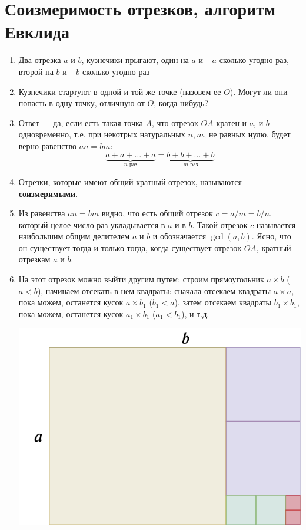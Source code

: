 \section{Соизмеримость отрезков, алгоритм Евклида}



\begin{enumerate}
\item Два отрезка $a$ и $b$, кузнечики прыгают, один на $a$ и $-a$ сколько угодно раз, второй на $b$ и $-b$ сколько угодно раз
\item Кузнечики стартуют в одной и той же точке (назовем ее $O$). Могут ли они попасть в одну точку, отличную от $O$, когда-нибудь?
\item Ответ --- да, если есть такая точка $A$, что отрезок $OA$ кратен и $a$, и $b$ одновременно, т.е. при некотрых натуральных $n,m$, не равных нулю, будет верно равенство $an=bm$:
$$
\underbrace{a+a+\dots+a}_{n\mbox{ раз}}=\underbrace{b+b+\dots+b}_{m\mbox{ раз}}
$$
\item Отрезки, которые имеют общий кратный отрезок, называются \textbf{соизмеримыми}.
\item Из равенства $an=bm$ видно, что есть общий отрезок $c=a/m=b/n$, который целое число раз укладывается в $a$ и в $b$. Такой отрезок $c$ называется наибольшим общим делителем $a$ и $b$ и обозначается $\gcd(a,b)$. Ясно, что он существует тогда и только тогда, когда существует отрезок $OA$, кратный отрезкам $a$ и $b$.
\item На этот отрезок можно выйти другим путем: строим прямоугольник $a\times b$ ($a<b$), начинаем отсекать в нем квадраты: сначала отсекаем квадраты $a\times a$, пока можем, останется кусок $a\times b_1$ ($b_1<a$), затем отсекаем квадраты $b_1\times b_1$, пока можем, останется кусок $a_1\times b_1$ ($a_1<b_1$), и т.д.
\begin{center}
\includegraphics[scale=0.5]{soizmer.png}
\end{center}


\end{enumerate}

